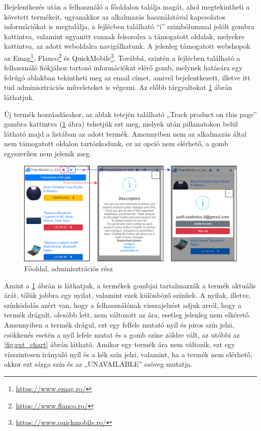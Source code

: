 Bejelentkezés után a felhasználó a főoldalon találja magát, ahol megtekintheti a követett termékeit, ugyanakkor az alkalmazás használatával kapcsolatos információkat is megtalálja, a fejlécben található “i” szimbólummal jelölt gombra kattintva, valamint ugyanitt vannak felsorolva a támogatott oldalak, melyekre kattintva, az adott weboldalra navigálhatunk. A jelenleg támogatott webshopok az Emag\footnote{\url{https://www.emag.ro/}}, Flanco\footnote{\url{https://www.flanco.ro/}} és QuickMobile\footnote{\url{https://www.quickmobile.ro/}}. Továbbá, szintén a fejlécben található a felhasználó fiókjához tartozó információkat elérő gomb, melynek hatására egy felrúgó ablakban tekintheti meg az email címet, amivel bejelentkezett, illetve itt tud adminisztrációs műveleteket is végezni. Az előbb tárgyaltokat \ref{fig:ext_homescreen_info_user} ábrán láthatjuk.

Új termék hozzáadásakor, az ablak tetején található „Track product on this page” gombra kattintva (\ref{fig:ext_homescreen_info_user} ábra) tehetjük ezt meg, melyek után pillanatokon belül látható majd a listában az adott termék. Amennyiben nem az alkalmazás által nem támogatott oldalon tartózkodunk, ez az opció nem elérhető, a gomb egyszerűen nem jelenik meg.

\begin{figure}[H]
    \centering
    \includegraphics[scale=1.15]{figures/images/home_info_user.png}
    \caption{Főoldal, adminisztrációs rész}
    \label{fig:ext_homescreen_info_user}
\end{figure}

Amint a \ref{fig:ext_homescreen_info_user} ábrán is láthatjuk, a termékek gombjai tartalmazzák a termék aktuális árát, tőlük jobbra egy nyilat, valamint ezek különböző színűek. A nyilak, illetve, színkódolás azért van, hogy a felhasználónak visszajelzést adjuk arról, hogy a termék drágult, olcsóbb lett, nem változott az ára, esetleg jelenleg nem elkérető. Amennyiben a termék drágul, ezt egy felfele mutató nyíl és piros szín jelzi, csökkenés esetén a nyíl lefele mutat és a gomb színe zöldre vált, az utóbbi az \ref{fig:ext_chart} ábrán látható. Amikor egy termék ára nem változik, ezt egy vízszintesen irányuló nyíl és a kék szín jelzi, valamint, ha a termék nem elérhető, akkor ezt sárga szín és az „UNAVAILABLE” szöveg mutatja.

